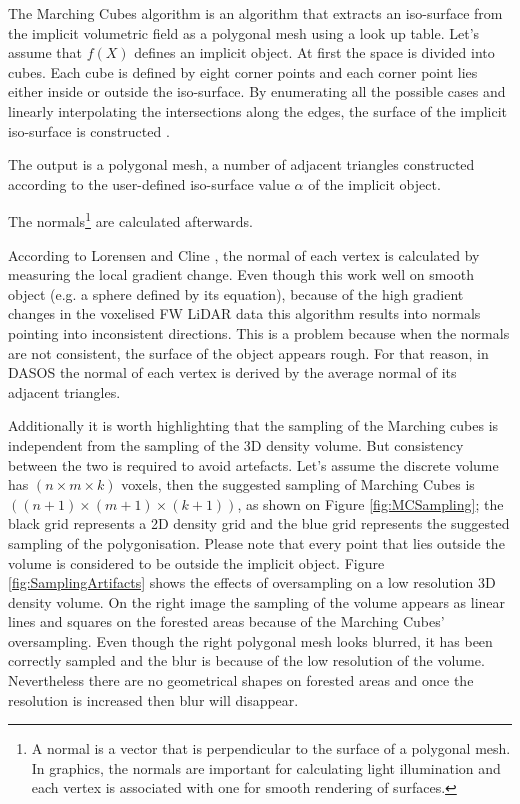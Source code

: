 \documentclass{subfiles}
\begin{document}
\par The Marching Cubes algorithm is an algorithm that extracts an iso-surface from the implicit volumetric field as a polygonal mesh using a look up table. Let’s assume that $f(X)$ defines an implicit object. At first the space is divided into cubes. Each cube is defined by eight corner points and each corner point lies either inside or outside the iso-surface. By enumerating all the possible cases and linearly interpolating the intersections along the edges, the surface of the implicit iso-surface is constructed \cite{Lorensen1987}. {\color{Fuchsia} The output is a polygonal mesh, a number of adjacent triangles constructed according to the user-defined iso-surface value $\alpha$  of the implicit object.
	
\par  The normals\footnote{ A normal is a vector that is perpendicular to the surface of a polygonal mesh. In graphics, the normals are important for calculating light illumination and each vertex is associated with one for smooth rendering of surfaces.} are calculated afterwards.} According to Lorensen and Cline \cite{Lorensen1987}, the normal of each vertex is calculated by measuring the local gradient change. Even though this work well on smooth object (e.g. a sphere defined by its equation), because of the high gradient changes in the voxelised FW LiDAR data this algorithm results into normals pointing into inconsistent directions. This is a problem because when the normals are not consistent, the surface of the object appears rough. For that reason, in DASOS the normal of each vertex is derived by the average normal of its adjacent triangles. 




\par Additionally it is worth highlighting that the sampling of the Marching cubes is independent from the sampling of the 3D density volume. But consistency between the two is required to avoid artefacts. Let’s assume the discrete volume has $(n \times m \times k)$ voxels, then the suggested sampling of Marching Cubes is $((n+1) \times (m+1) \times (k+1))$, as shown on Figure \ref{fig:MCSampling}; the black grid represents a 2D density grid and the blue grid represents the suggested sampling of the polygonisation. Please note that every point that lies outside the volume is considered to be outside the implicit object. {\color{Fuchsia} Figure \ref{fig:SamplingArtifacts} shows the effects of oversampling on a low resolution 3D density volume. On the right image the sampling of the volume appears as linear lines and squares on the forested areas because of the Marching Cubes' oversampling. Even though the right polygonal mesh looks blurred, it has been correctly sampled and the blur is because of the low resolution of the volume. Nevertheless there are no geometrical shapes on forested areas and once the resolution is increased then blur will disappear. }
\end{document}
